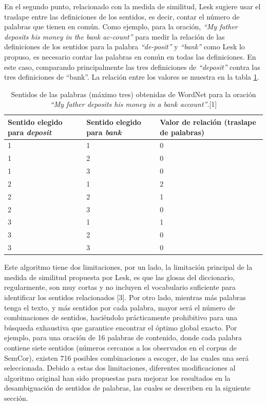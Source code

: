 \clearpage
En el segundo punto, relacionado con la medida de similitud, Lesk sugiere usar el traslape entre las definiciones de los sentidos, es decir, contar el número de palabras que tienen en común.
Como ejemplo, para la oración, \textit{“My father deposits his money in the bank ac-count”} para medir la relación de las definiciones de los sentidos para la palabra \textit{“de-posit”} y \textit{“bank”} como Lesk lo propuso, es necesario contar las palabras en común en todas las definiciones. En este caso, comparando principalmente las tres definiciones de \textit{“deposit”} contra las tres definiciones de “bank”. La relación entre los valores se muestra en la tabla \ref{tab:sentidos_palabras}.

  \begin{table}[]
    \centering
      \begin{tabular}{|m{4cm}|m{4cm}|m{4cm}|}
      \hline
      Sentido elegido para \textit{deposit} & Sentido elegido para \textit{bank} & Valor de relación (traslape de palabras)\\
      \hline
      1 & 1 & 0 \\
      \hline
      1 & 2 & 0 \\
      \hline
      1 & 3 & 0 \\
      \hline
      2 & 1 & 2 \\
      \hline
      2 & 2 & 1 \\
      \hline
      2 & 3 & 0 \\
      \hline
      3 & 1 & 1 \\
      \hline
      3 & 2 & 0 \\
      \hline
      3 & 3 & 0 \\
      \hline
     \end{tabular}
   \caption{Sentidos de las palabras (máximo tres) obtenidas de WordNet para la oración \textit{“My father deposits his money in a bank account”}.[1]}
   \label{tab:sentidos_palabras}
  \end{table}

Este algoritmo tiene dos limitaciones, por un lado, la limitación principal de la medida de similitud propuesta por Lesk, es que las glosas del diccionario, regularmente, son muy cortas y no incluyen el vocabulario suficiente para identificar los sentidos relacionados [3].
Por otro lado, mientras más palabras tenga el texto, y más sentidos por cada palabra, mayor será el número de combinaciones de sentidos, haciéndolo prácticamente prohibitivo para una búsqueda exhaustiva que garantice encontrar el óptimo global exacto. Por ejemplo, para una oración de 16 palabras de contenido, donde cada palabra contiene siete sentidos (números cercanos a los observados en el corpus de SemCor), existen 716 posibles combinaciones a escoger, de las cuales una será seleccionada.
Debido a estas dos limitaciones, diferentes modificaciones al algoritmo original han sido propuestas para mejorar los resultados en la desambiguación de sentidos de palabras, las cuales se describen en la siguiente sección.

